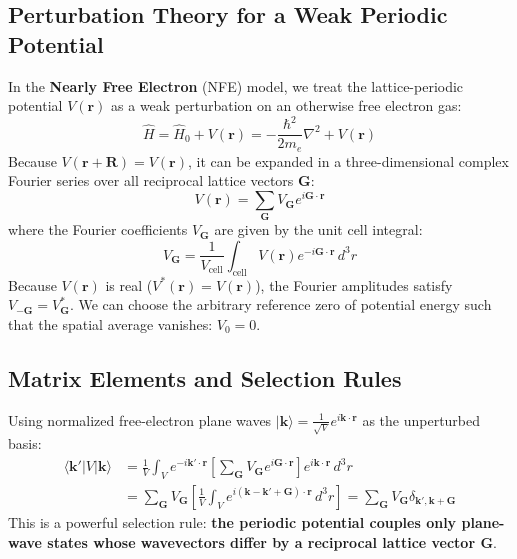 \documentclass[11pt,a4paper]{article}
\newcommand{\vb}[1]{\mathbf{#1}}
\begin{document}
\subsection{Perturbation Theory for a Weak Periodic Potential}
In the \textbf{Nearly Free Electron} (NFE) model, we treat the lattice-periodic potential $V(\vb{r})$ as a weak perturbation on an otherwise free electron gas:
\begin{equation}
\hat{H} = \hat{H}_0 + V(\vb{r}) = -\frac{\hbar^2}{2m_e}\nabla^2 + V(\vb{r})
\end{equation}
Because $V(\vb{r} + \vb{R}) = V(\vb{r})$, it can be expanded in a three-dimensional complex Fourier series over all reciprocal lattice vectors $\vb{G}$:
\begin{equation}
V(\vb{r}) = \sum_{\vb{G}} V_{\vb{G}} e^{i\vb{G}\cdot\vb{r}}
\label{eq:fourier_potential}
\end{equation}
where the Fourier coefficients $V_{\vb{G}}$ are given by the unit cell integral:
\begin{equation}
V_{\vb{G}} = \frac{1}{V_{\mathrm{cell}}}\int_{\mathrm{cell}} V(\vb{r}) e^{-i\vb{G}\cdot\vb{r}}\,d^3r
\end{equation}
Because $V(\vb{r})$ is real ($V^*(\vb{r}) = V(\vb{r})$), the Fourier amplitudes satisfy $V_{-\vb{G}} = V_{\vb{G}}^*$. We can choose the arbitrary reference zero of potential energy such that the spatial average vanishes: $V_0 = 0$.

\subsection{Matrix Elements and Selection Rules}
Using normalized free-electron plane waves $|\vb{k}\rangle = \frac{1}{\sqrt{V}}e^{i\vb{k}\cdot\vb{r}}$ as the unperturbed basis:
\begin{align}
\langle \vb{k}' | V | \vb{k} \rangle &= \frac{1}{V}\int_V e^{-i\vb{k}'\cdot\vb{r}} \left[ \sum_{\vb{G}} V_{\vb{G}} e^{i\vb{G}\cdot\vb{r}} \right] e^{i\vb{k}\cdot\vb{r}}\,d^3r \nonumber \\
&= \sum_{\vb{G}} V_{\vb{G}} \left[ \frac{1}{V}\int_V e^{i(\vb{k} - \vb{k}' + \vb{G})\cdot\vb{r}}\,d^3r \right] = \sum_{\vb{G}} V_{\vb{G}} \delta_{\vb{k}',\vb{k}+\vb{G}}
\label{eq:matrix_element_selection}
\end{align}
This is a powerful selection rule: \textbf{the periodic potential couples only plane-wave states whose wavevectors differ by a reciprocal lattice vector $\vb{G}$}.
\end{document}
